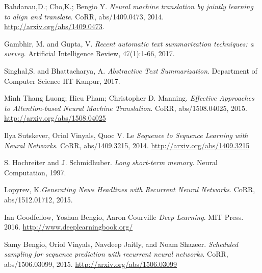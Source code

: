 \begin{thebibliography}{9}
	Bahdanau,D.; Cho,K.; Bengio Y. \textit{Neural machine translation by jointly learning to align and translate}. CoRR, abs/1409.0473, 2014. \url{ http://arxiv.org/abs/1409.0473}.
	
	Gambhir, M. and Gupta, V. \textit{Recent automatic text summarization techniques: a survey}. Artificial Intelligence Review, 47(1):1-66, 2017.
	
	Singhal,S. and Bhattacharya, A. \textit{Abstractive Text Summarization}. Department of Computer Science IIT Kanpur, 2017.
	
	Minh Thang Luong; Hieu Pham; Christopher D. Manning. \textit{Effective Approaches to Attention-based Neural Machine Translation}. CoRR, abs/1508.04025, 2015. \url{http://arxiv.org/abs/1508.04025}
	
	Ilya Sutskever, Oriol Vinyals, Quoc V. Le \textit{Sequence to Sequence Learning with Neural Networks}. CoRR, abs/1409.3215, 2014. \url{http://arxiv.org/abs/1409.3215}
	
	S. Hochreiter and J. Schmidhuber. \textit{Long short-term memory}. Neural Computation, 1997.
		 
	Lopyrev, K.\textit{Generating News Headlines with Recurrent Neural 	Networks}. CoRR, abs/1512.01712, 2015.
	
	Ian Goodfellow, Yoshua Bengio, Aaron Courville \textit{Deep Learning}. MIT Press. 2016. \url{http://www.deeplearningbook.org/}
	
	Samy Bengio, Oriol Vinyals, Navdeep Jaitly, and Noam Shazeer. \textit{Scheduled sampling for sequence
prediction with recurrent neural networks}. CoRR, abs/1506.03099, 2015. \url{http://arxiv.org/abs/1506.03099}
	
\end{thebibliography}


